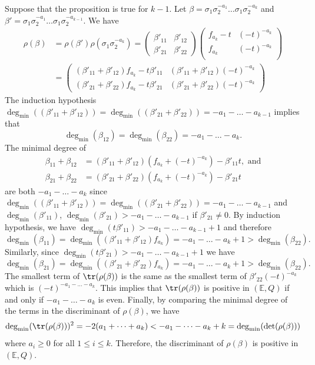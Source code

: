 \documentclass{amsart}
\makeatletter
\renewenvironment{proof}[1][\proofname]{%
   \par\pushQED{\qed}\normalfont%
   \topsep6\p@\@plus6\p@\relax
   \trivlist\item[\hskip\labelsep\bfseries#1\@addpunct{.}]%
   \ignorespaces
}{%
   \popQED\endtrivlist\@endpefalse
}
\makeatother
\begin{document}
\begin{proof}
    Suppose that the proposition is true for $k-1$. Let $\beta = \sigma_1\sigma_2^{-a_1}\dots\sigma_1\sigma_2^{-a_k} $ and $\beta' = \sigma_1\sigma_2^{-a_1}\dots\sigma_1\sigma_2^{-a_{k-1}} $. We have 
    \begin{align*}
    \rho(\beta) &= \rho(\beta')\rho(\sigma_1\sigma_2^{-a_k} ) = 
    \begin{pmatrix}
        \beta'_{11} & \beta'_{12} \\ \beta'_{21} & \beta'_{22} 
    \end{pmatrix}
     \begin{pmatrix}
        f_{a_{k}} - t & (-t)^{-a_k}  \\ f_{a_{k}} &  (-t)^{-a_k} \\ 
    \end{pmatrix}
     \\ 
    &=\begin{pmatrix}
    (\beta'_{11}+\beta'_{12})f_{a_k} - t\beta'_{11} & (\beta'_{11}+\beta'_{12})(-t)^{-a_k} \\ (\beta'_{21}+\beta'_{22})f_{a_k} - t\beta'_{21} & (\beta'_{21}+\beta'_{22})(-t)^{-a_k}
    \end{pmatrix} 
    \end{align*}
    The induction hypothesis $\deg_{\min}((\beta'_{11}+\beta'_{12}))= \deg_{\min}((\beta'_{21}+\beta'_{22})) = -a_1 -\dots -a_{k-1}$ implies that 
    \[
    \deg_{\min}(\beta_{12}) = \deg_{\min}(\beta_{22}) = -a_1-\dots-a_k.
    \]
    The minimal degree of 
    \begin{align*}
    \beta_{11} + \beta_{12} &= (\beta'_{11}+\beta'_{12})(f_{a_k}+(-t)^{-a_k}) - \beta'_{11} t, \text{ and} \\
    \beta_{21} + \beta_{22} &= (\beta'_{21}+\beta'_{22})(f_{a_k}+(-t)^{-a_k}) - \beta'_{21} t 
    \end{align*}
    are both $-a_1 - \dots - a_k$ since $\deg_{\min}((\beta'_{11}+\beta'_{12}))= \deg_{\min}((\beta'_{21}+\beta'_{22})) = -a_1 -\dots -a_{k-1}$ and $\deg_{\min}(\beta'_{ 11})$, $\deg_{\min}(\beta'_{21}) > -a_1 - \dots - a_{k-1}$ if $\beta'_{21} \neq 0$. By induction hypothesis, we have $\deg_{\min}(t\beta'_{11}) > -a_1-\dots-a_{k-1}+1$ and therefore
    \[
    \deg_{\min}(\beta_{11}) = \deg_{\min}((\beta'_{11}+\beta'_{12})f_{a_k}) = -a_1-\dots-a_k+1 > \deg_{\min}(\beta_{22}).
    \]
    Similarly, since $\deg_{\min}(t\beta'_{21}) > -a_1-\dots-a_{k-1}+1$ we have 
    \[
    \deg_{\min}(\beta_{21}) = \deg_{\min}((\beta'_{21}+\beta'_{22})f_{a_k}) = -a_1-\dots-a_k+1 > \deg_{\min}(\beta_{22}).
    \]
    The smallest term of $\tr(\rho(\beta))$ is the same as the smallest term of $\beta'_{22}(-t)^{-a_k}$ which is $(-t)^{-a_1-\dots-a_k}$. This implies that $\tr(\rho(\beta))$ is positive in $(\mathbb{E},Q)$ if and only if $-a_1-\dots-a_k$ is even. Finally, by comparing the minimal degree of the terms in the discriminant of $\rho(\beta)$, we have
    \[
    \deg_{\min}(\tr(\rho(\beta)))^2 = -2(a_1+\dots+a_k) < -a_1-\dots-a_k + k = \deg_{\min}(\det(\rho(\beta)))
    \]
    where $a_i \geq 0$ for all $1\leq i \leq k$. Therefore, the discriminant of $\rho(\beta)$ is positive in $(\mathbb{E},Q)$. 
\end{proof}
\end{document}
